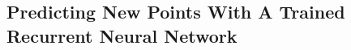 \documentclass[%
oneside,                 %
final,                   %
10pt]{article}
\begin{document}
\subsection*{Predicting New Points With A Trained Recurrent Neural Network}
\end{document}

